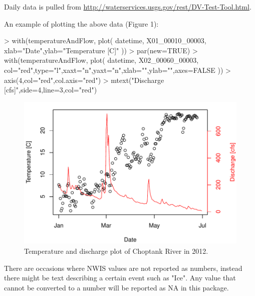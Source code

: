\documentclass[a4paper,11pt]{article}
\begin{document}
Daily data is pulled from \url{http://waterservices.usgs.gov/rest/DV-Test-Tool.html}. 

An example of plotting the above data (Figure 1):

\begin{Schunk}
\begin{Sinput}
> with(temperatureAndFlow, plot(
   datetime, X01_00010_00003,
   xlab="Date",ylab="Temperature [C]"
   ))
> par(new=TRUE)
> with(temperatureAndFlow, plot(
   datetime, X02_00060_00003,
   col="red",type="l",xaxt="n",yaxt="n",xlab="",ylab="",axes=FALSE
   ))
> axis(4,col="red",col.axis="red")
> mtext("Discharge [cfs]",side=4,line=3,col="red")
\end{Sinput}
\end{Schunk}
\newpage

\begin{figure}
\begin{center}
\includegraphics{dataRetrieval-fig1}
\end{center}
\caption{Temperature and discharge plot of Choptank River in 2012.}
\end{figure}


There are occasions where NWIS values are not reported as numbers, instead there might be text describing a certain event such as "Ice".  Any value that cannot be converted to a number will be reported as NA in this package.




\end{document}
